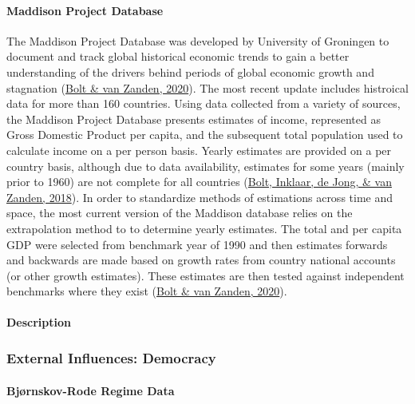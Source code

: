 \documentclass[12pt,twoside]{reedthesis}
\begin{document}
\hypertarget{maddison}{%
\paragraph{Maddison Project Database}\label{maddison}}

The Maddison Project Database was developed by University of Groningen to document and track global historical economic trends to gain a better understanding of the drivers behind periods of global economic growth and stagnation (\protect\hyperlink{ref-boltMaddisonStyleEstimates2020}{Bolt \& van Zanden, 2020}). The most recent update includes histroical data for more than 160 countries. Using data collected from a variety of sources, the Maddison Project Database presents estimates of income, represented as Gross Domestic Product per capita, and the subsequent total population used to calculate income on a per person basis. Yearly estimates are provided on a per country basis, although due to data availability, estimates for some years (mainly prior to 1960) are not complete for all countries (\protect\hyperlink{ref-boltRebasingMaddisonNew2018}{Bolt, Inklaar, de Jong, \& van Zanden, 2018}). In order to standardize methods of estimations across time and space, the most current version of the Maddison database relies on the extrapolation method to to determine yearly estimates. The total and per capita GDP were selected from benchmark year of 1990 and then estimates forwards and backwards are made based on growth rates from country national accounts (or other growth estimates). These estimates are then tested against independent benchmarks where they exist (\protect\hyperlink{ref-boltMaddisonStyleEstimates2020}{Bolt \& van Zanden, 2020}).

\hypertarget{description}{%
\paragraph{Description}\label{description}}

\hypertarget{democracy}{%
\subsubsection{External Influences: Democracy}\label{democracy}}

\hypertarget{BRdemo}{%
\paragraph{Bjørnskov-Rode Regime Data}\label{BRdemo}}
\end{document}
